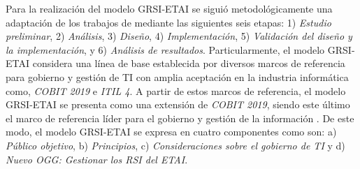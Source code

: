 Para la realización del modelo \acrshort{GRSI-ETAI} se siguió metodológicamente una adaptación de los trabajos de \textcite{Hernandez-Sampieri2014} mediante las siguientes seis etapas: 1) \textit{Estudio preliminar}, 2) \textit{Análisis}, 3) \textit{Diseño}, 4) \textit{Implementación}, 5) \textit{Validación del diseño y la implementación},  y 6) \textit{Análisis de resultados}. Particularmente, el modelo \acrshort{GRSI-ETAI} considera una línea de base establecida por diversos marcos de referencia para gobierno y gestión de TI con amplia aceptación en la industria informática como, \textit{COBIT 2019} e \textit{ITIL 4}. A partir de estos marcos de referencia, el modelo \acrshort{GRSI-ETAI} se presenta como una extensión de \textit{COBIT 2019}, siendo este último el marco de referencia líder para el gobierno y gestión de la información \parencite{Steuperaert2019}. De este modo, el modelo \acrshort{GRSI-ETAI} se expresa en cuatro componentes como son: a) \textit{Público objetivo}, b) \textit{Principios}, c) \textit{Consideraciones sobre el gobierno de TI} y d) \textit{Nuevo \acrfull{OGG}: Gestionar los \acrshort{RSI} del \acrshort{ETAI}}.









